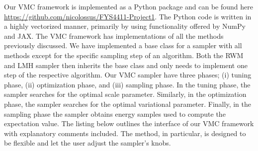 
Our VMC framework is implemented as a Python package and can be found here \url{https://github.com/nicolossus/FYS4411-Project1}. The Python code is written in a highly vectorized manner, primarily by using functionality offered by NumPy \citep{numpy} and JAX. The VMC framework has implementations of all the methods previously discussed. We have implemented a base class for a sampler with all methods except for the specific sampling step of an algorithm. Both the RWM and LMH sampler then inherits the base class and only needs to implement one step of the respective algorithm. Our VMC sampler have three phases; (i) tuning phase, (ii) optimization phase, and (iii) sampling phase. In the tuning phase, the sampler searches for the optimal scale parameter. Similarly, in the optimization phase, the sampler searches for the optimal variational parameter. Finally, in the sampling phase the sampler obtains energy samples used to compute the expectation value. The listing below outlines the interface of our VMC framework with explanatory comments included. The  method, in particular, is designed to be flexible and let the user adjust the sampler's knobs. 

